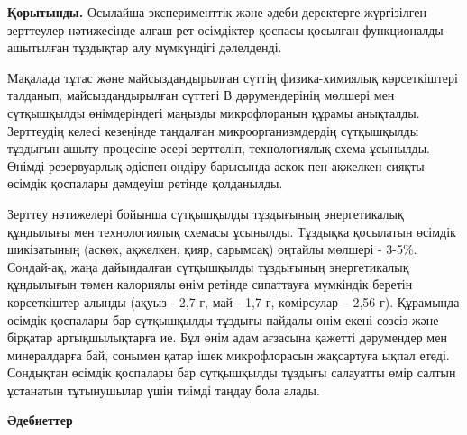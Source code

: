 \begin{multicols}{2}
{\bfseries Қорытынды.} Осылайша эксперименттік және әдеби деректерге
жүргізілген зерттеулер нәтижесінде алғаш рет өсімдіктер қоспасы қосылған
функционалды ашытылған тұздықтар алу мүмкүндігі дәлелденді.

Мақалада тұтас және майсыздандырылған сүттің физика-химиялық
көрсеткіштері талданып, майсыздандырылған сүттегі В дәрумендерінің
мөлшері мен сүтқышқылды өнімдеріндегі маңызды микрофлораның құрамы
анықталды. Зерттеудің келесі кезеңінде таңдалған микроорганизмдердің
сүтқышқылды тұздығын ашыту процесіне әсері зерттеліп, технологиялық
схема ұсынылды. Өнімді резервуарлық әдіспен өндіру барысында аскөк пен
ақжелкен сияқты өсімдік қоспалары дәмдеуіш ретінде қолданылды.

Зерттеу нәтижелері бойынша сүтқышқылды тұздығының энергетикалық
құндылығы мен технологиялық схемасы ұсынылды. Тұздыққа қосылатын өсімдік
шикізатының (аскөк, ақжелкен, қияр, сарымсақ) оңтайлы мөлшері - 3-5\%.
Сондай-ақ, жаңа дайындалған сүтқышқылды тұздығының энергетикалық
құндылығын төмен калориялы өнім ретінде сипаттауға мүмкіндік беретін
көрсеткіштер алынды (ақуыз - 2,7 г, май - 1,7 г, көмірсулар -- 2,56 г).
Құрамында өсімдік қоспалары бар сүтқышқылды тұздығы пайдалы өнім екені
сөзсіз және бірқатар артықшылықтарға ие. Бұл өнім адам ағзасына қажетті
дәрумендер мен минералдарға бай, сонымен қатар ішек микрофлорасын
жақсартуға ықпал етеді. Сондықтан өсімдік қоспалары бар сүтқышқылды
тұздығы салауатты өмір салтын ұстанатын тұтынушылар үшін тиімді таңдау
бола алады.
\end{multicols}

\begin{center}
{\bfseries Әдебиеттер}
\end{center}


